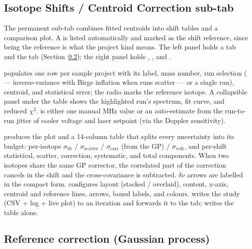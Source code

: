 \subsection{Isotope Shifts / Centroid Correction sub-tab}

The permanent  sub-tab
combines fitted centroids into shift tables and a comparison plot. A
 is listed automatically and marked as the
shift reference, since being the reference is what the project kind
means. The
left panel holds a  tab and the
 tab
(Section~\ref{sec:analysis_gp}); the right panel holds ,
, and .

 populates one row per sample project
with its label, mass number, run selection (
--- inverse-variance with Birge inflation when runs scatter --- or a
single run), centroid, and statistical error; the  radio
marks the reference isotope. A collapsible  panel
under the table shows the highlighted run's spectrum, fit curve, and
reduced $\chi^2$.  is either one manual MHz
value or an auto-estimate from the run-to-run jitter of cooler
voltage and laser setpoint (via the Doppler sensitivity).

 produces the plot and a 14-column table that
splits every uncertainty into its budget: per-isotope
$\sigma_{\mathrm{fit}}$ / $\sigma_{\mathrm{scatter}}$ /
$\sigma_{\mathrm{corr}}$ (from the GP) / $\sigma_{\mathrm{volt}}$,
and per-shift statistical, scatter, correction, systematic, and
total components. When two isotopes share the same GP corrector,
the correlated part of the correction cancels in the shift and the
cross-covariance is subtracted. $\delta\nu$ arrows are labelled in
the compact  form. 
configures layout (stacked / overlaid), content, x-axis, centroid
and reference lines, arrows, boxed labels, and colours.
 writes the study (CSV + log + live plot) to an
 iteration and forwards it to the 
tab;  writes the table alone.

\subsection{Reference correction (Gaussian process)}
\label{sec:analysis_gp}

